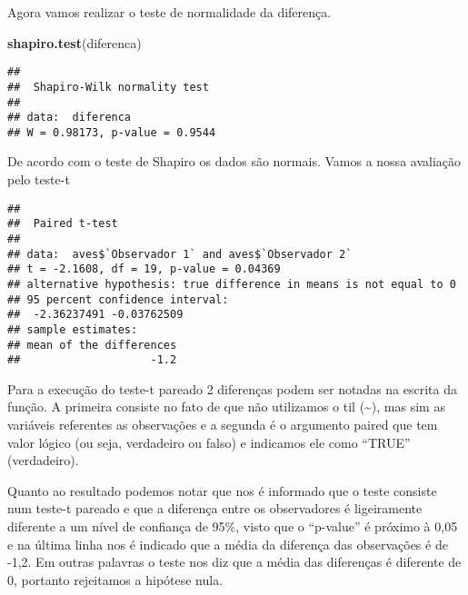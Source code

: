 \documentclass[]{book}
\newenvironment{Shaded}{\begin{snugshade}}{\end{snugshade}}
\newcommand{\DataTypeTok}[1]{\textcolor[rgb]{0.13,0.29,0.53}{#1}}
\newcommand{\FloatTok}[1]{\textcolor[rgb]{0.00,0.00,0.81}{#1}}
\newcommand{\KeywordTok}[1]{\textcolor[rgb]{0.13,0.29,0.53}{\textbf{#1}}}
\newcommand{\NormalTok}[1]{#1}
\newcommand{\OperatorTok}[1]{\textcolor[rgb]{0.81,0.36,0.00}{\textbf{#1}}}
\newcommand{\OtherTok}[1]{\textcolor[rgb]{0.56,0.35,0.01}{#1}}
\newcommand{\StringTok}[1]{\textcolor[rgb]{0.31,0.60,0.02}{#1}}
\begin{document}
Agora vamos realizar o teste de normalidade da diferença.

\begin{Shaded}
\begin{Highlighting}[]
\KeywordTok{shapiro.test}\NormalTok{(diferenca)}
\end{Highlighting}
\end{Shaded}

\begin{verbatim}
## 
##  Shapiro-Wilk normality test
## 
## data:  diferenca
## W = 0.98173, p-value = 0.9544
\end{verbatim}

De acordo com o teste de Shapiro os dados são normais. Vamos a nossa avaliação pelo teste-t

\begin{Shaded}
\end{Shaded}

\begin{verbatim}
## 
##  Paired t-test
## 
## data:  aves$`Observador 1` and aves$`Observador 2`
## t = -2.1608, df = 19, p-value = 0.04369
## alternative hypothesis: true difference in means is not equal to 0
## 95 percent confidence interval:
##  -2.36237491 -0.03762509
## sample estimates:
## mean of the differences 
##                    -1.2
\end{verbatim}

Para a execução do teste-t pareado 2 diferenças podem ser notadas na escrita da função. A primeira consiste no fato de que não utilizamos o til (\textasciitilde{}), mas sim as variáveis referentes as observações e a segunda é o argumento paired que tem valor lógico (ou seja, verdadeiro ou falso) e indicamos ele como ``TRUE'' (verdadeiro).

Quanto ao resultado podemos notar que nos é informado que o teste consiste num teste-t pareado e que a diferença entre os observadores é ligeiramente diferente a um nível de confiança de 95\%, visto que o ``p-value'' é próximo à 0,05 e na última linha nos é indicado que a média da diferença das observações é de -1,2. Em outras palavras o teste nos diz que a média das diferenças é diferente de 0, portanto rejeitamos a hipótese nula.
\end{document}
